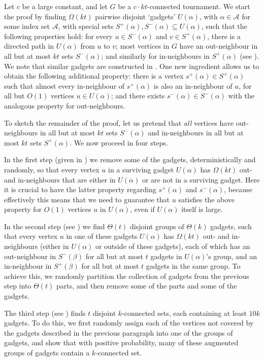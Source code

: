 \documentclass[english]{article}
\theoremstyle{plain}
\theoremstyle{remark}
\def \Sp {S^+}
\def \Sm {S^-}
\def \sp {s^+}
\def \smm {s^-}
\newcommand{\A}{\mathcal{A}}
\begin{document}
	Let $c$ be a large constant, and let $G$ be a $c\cdot kt$-connected tournament.
	We start the proof by finding $\Omega(kt)$ pairwise disjoint `gadgets' $U(\alpha)$, with $\alpha \in \A$ for some index set $\A$, with special sets $\Sp(\alpha), \Sm(\alpha) \subseteq U(\alpha)$, such that the following properties hold:
	for every $u \in \Sm(\alpha)$ and $v \in \Sp(\alpha)$, there is a directed path in $U(\alpha)$ from $u$ to $v$; most vertices in $G$ have an out-neighbour in all but at most $kt$ sets $\Sm(\alpha)$; and similarly for in-neighbours in $\Sp(\alpha)$ (see ). We note that similar gadgets are constructed in \cite{kuhn2016proof}. One new ingredient allows us to obtain the following additional property: there is a vertex $\sp(\alpha) \in \Sp(\alpha)$ such that almost every in-neighbour of $\sp(\alpha)$ is also an in-neighbour of $u$, for all but $O(1)$ vertices $u \in U(\alpha)$; and there exists $\smm(\alpha) \in \Sm(\alpha)$ with the analogous property for out-neighbours.

	To sketch the remainder of the proof, let us pretend that \emph{all} vertices have out-neighbours in all but at most $kt$ sets $\Sm(\alpha)$ and in-neighbours in all but at most $kt$ sets $\Sp(\alpha)$.
	We now proceed in four steps.

	In the first step (given in ) we remove some of the gadgets, deterministically and randomly, so that every vertex $u$ in a surviving gadget $U(\alpha)$ has $\Omega(kt)$ out- and in-neighbours that are either in $U(\alpha)$ or are not in a surviving gadget. Here it is crucial to have the latter property regarding $\sp(\alpha)$ and $\smm(\alpha)$, because effectively this means that we need to guarantee that $u$ satisfies the above property for $O(1)$ vertices $u$ in $U(\alpha)$, even if $U(\alpha)$ itself is large.

	In the second step (see ) we find $\Theta(t)$ disjoint groups of $\Theta(k)$ gadgets, such that every vertex $u$ in one of these gadgets $U(\alpha)$ has $\Omega(kt)$ out- and in-neighbours (either in $U(\alpha)$ or outside of these gadgets), each of which has an out-neighbour in $\Sm(\beta)$ for all but at most $t$ gadgets in $U(\alpha)$'s group, and an in-neighbour in $\Sp(\beta)$ for all but at most $t$ gadgets in the same group. To achieve this, we randomly partition the collection of gadgets from the previous step into $\Theta(t)$ parts, and then remove some of the parts and some of the gadgets.
	
	The third step (see ) finds $t$ disjoint $k$-connected sets, each containing at least $10k$ gadgets. To do this, we first randomly assign each of the vertices not covered by the gadgets described in the previous paragraph into one of the groups of gadgets, and show that with positive probability, many of these augmented groups of gadgets contain a $k$-connected set.
\end{document}
